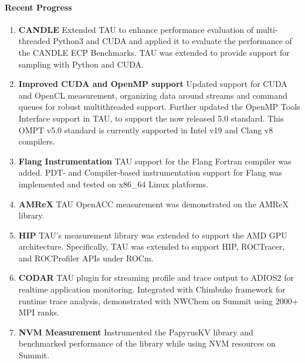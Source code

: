\paragraph{Recent Progress}
\begin{enumerate}
\item \textbf{CANDLE} Extended TAU to enhance performance evaluation of multi-threaded Python3 and CUDA and applied it to evaluate the performance of the CANDLE ECP Benchmarks. TAU was extended to provide support for sampling with Python and CUDA. 

\item \textbf{Improved CUDA and OpenMP support} Updated support for CUDA and OpenCL measurement, organizing data around streams and command queues for robust multithreaded support.  Further updated the OpenMP Tools Interface support in TAU, to support the now released 5.0 standard. This OMPT v5.0 standard is currently supported in Intel v19 and Clang v8 compilers. 

\item \textbf{Flang Instrumentation} TAU support for the Flang Fortran compiler was added.  PDT- and Compiler-based instrumentation support for Flang was implemented and tested on x86\_64 Linux platforms.

\item \textbf{AMReX} TAU OpenACC measurement was demonstrated on the AMReX library.

\item \textbf{HIP} TAU's measurement library was extended to support the AMD GPU architecture. Specifically, TAU was extended to support HIP, ROCTracer, and ROCProfiler APIs under ROCm.

\item \textbf{CODAR} TAU plugin for streaming profile and trace output to ADIOS2 for realtime application monitoring.  Integrated with Chimbuko framework for runtime trace analysis, demonstrated with NWChem on Summit using 2000+ MPI ranks.

\item \textbf{NVM Measurement} Instrumented the PapyrusKV library and benchmarked performance of the library while using NVM resources on Summit.
\end{enumerate}

